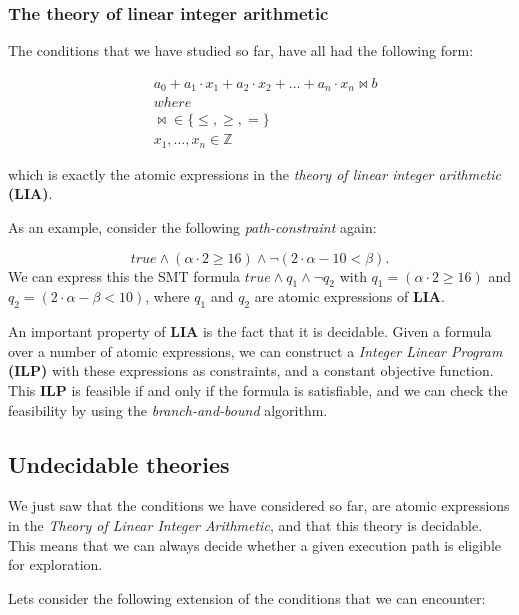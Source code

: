 	\subsubsection{The theory of linear integer arithmetic}
		The conditions that we have studied so far, have all had the following form:
		
		\begin{align*}
			& a_0 +  a_1 \cdot x_1 + a_2\cdot x_2 + \ldots + a_n \cdot x_n \bowtie b\\
			& where\\
			& \bowtie \in \{\leq, \geq, =\}\\
			& x_1, \ldots, x_n \in \mathbb{Z}			
		\end{align*}
		
	which is exactly the atomic expressions in the \emph{theory of linear integer arithmetic} \textbf{(LIA)}. 
	
	As an example, consider the following \emph{path-constraint} again:
	
	\begin{equation}
		true \land (\alpha \cdot 2 \geq 16) \land \neg (2\cdot \alpha - 10 < \beta).
	\end{equation}	
	We can express this the SMT formula $true \land q_1 \land \neg q_2$ with $q_1 = (\alpha \cdot 2 \geq 16)$ and $q_2 = (2\cdot \alpha - \beta < 10)$, where $q_1$ and $q_2$ are atomic expressions of \textbf{LIA}.
	
	An important property of \textbf{LIA} is the fact that it is decidable. Given a formula over a number of atomic expressions, we can construct a \emph{Integer Linear Program} \textbf{(ILP)} with these expressions as constraints, and a constant objective function. This \textbf{ILP} is feasible if and only if the formula is satisfiable, and we can check the feasibility by using the \emph{branch-and-bound} algorithm.
	
	\subsection{Undecidable theories}
	
	We just saw that the conditions we have considered so far, are atomic expressions in the \emph{Theory of Linear Integer Arithmetic}, and that this theory is decidable. This means that we can always decide whether a given execution path is eligible for exploration.
	 
	Lets consider the following extension of the conditions that we can encounter:
	
